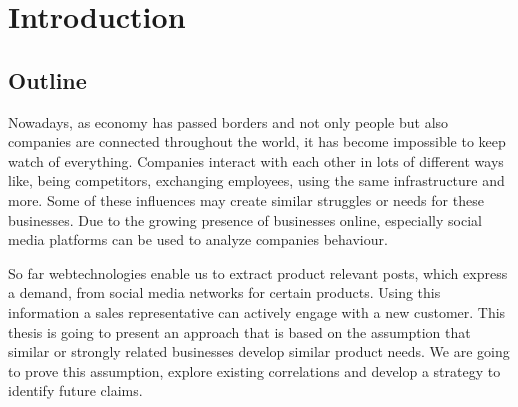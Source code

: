 \section{Introduction}

\subsection{Outline}

Nowadays, as economy has passed borders and not only people but also companies are connected throughout the world,
it has become impossible to keep watch of everything. Companies interact with each other in lots of different ways like,
being competitors, exchanging employees, using the same infrastructure and more. Some of these influences may create
similar struggles or needs for these businesses. Due to the growing presence of businesses online, especially
social media platforms can be used to analyze companies behaviour.

So far webtechnologies enable us to extract product relevant posts, which express a demand,
from social media networks for certain products. Using this information a sales representative can
actively engage with a new customer. This thesis is going to present an approach that is based on the assumption
that similar or strongly related businesses develop similar product needs. We are going to prove this assumption,
explore existing correlations and develop a strategy to identify future claims.
